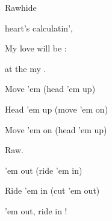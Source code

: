 \begin{SBSong}{Rawhide}
\begin{SBVerse}
     heart's calculatin',
    
    My  love will be :
    
     at the   my .
  \end{SBVerse}
  \begin{SBChorus}
    Move 'em  (head 'em up)
    
    Head 'em up (move 'em on)
    
    Move 'em on (head 'em up)
    
    Raw.
    
     'em out (ride 'em in)
    
    Ride 'em in (cut 'em out)
    
     'em out, ride  in !
  \end{SBChorus}
\end{SBSong}
